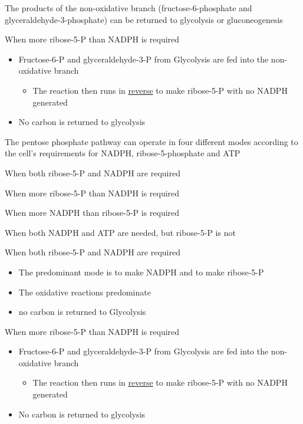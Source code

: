 \documentclass[bigger]{beamer}
\begin{document}
\begin{frame}[label={sec:org61ce90b}]{The products of the non-oxidative branch (fructose-6-phosphate and glyceraldehyde-3-phosphate) can be returned to glycolysis or gluconeogenesis}
\begin{block}{When \alert{more} ribose-5-P than NADPH is required}
\begin{itemize}
\item Fructose-6-P and glyceraldehyde-3-P from Glycolysis are fed into the
non-oxidative branch
\begin{itemize}
\item The reaction then runs in \uline{reverse} to make ribose-5-P with \alert{no} NADPH generated
\end{itemize}
\item \alert{No} carbon is returned to glycolysis
\end{itemize}
\end{block}
\end{frame}

\begin{frame}[label={sec:orgc814f0b}]{The pentose phosphate pathway can operate in four different modes according to the cell’s requirements for NADPH, ribose-5-phosphate and ATP}
\begin{block}{When \alert{both} ribose-5-P and NADPH are required}
\end{block}
\begin{block}{When \alert{more} ribose-5-P than NADPH is required}
\end{block}
\begin{block}{When \alert{more} NADPH than ribose-5-P is required}
\end{block}
\begin{block}{When \alert{both} NADPH and ATP are needed, but ribose-5-P is not}
\end{block}
\end{frame}
\begin{frame}[label={sec:org1e35aa7}]{When \alert{both} ribose-5-P and NADPH are required}
\begin{itemize}
\item The predominant mode is to make NADPH and to make ribose-5-P
\item The oxidative reactions predominate
\item no carbon is returned to Glycolysis
\end{itemize}
\end{frame}

\begin{frame}[label={sec:org9769b09}]{When \alert{more} ribose-5-P than NADPH is required}
\begin{itemize}
\item Fructose-6-P and glyceraldehyde-3-P from Glycolysis are fed into the
non-oxidative branch
\begin{itemize}
\item The reaction then runs in \uline{reverse} to make ribose-5-P with \alert{no} NADPH generated
\end{itemize}
\item \alert{No} carbon is returned to glycolysis
\end{itemize}
\end{frame}
\end{document}
